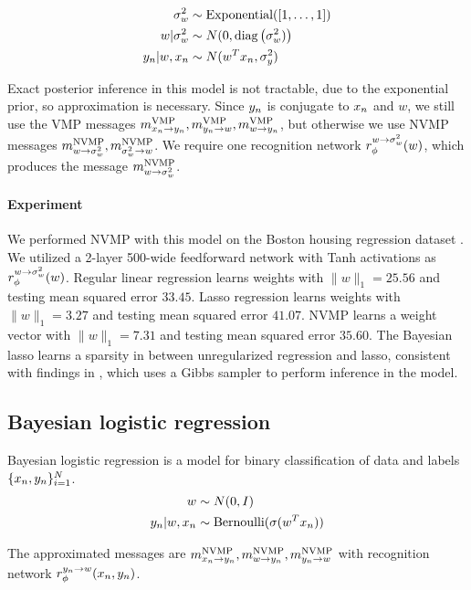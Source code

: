 \begin{align*}
    \sigma_w^2 &\sim \text{Exponential}([1, \ldots, 1]) \\
    w | \sigma^2_w &\sim N(0, \text{diag}\left(\sigma_w^2)\right) \\
    y_n | w, x_n &\sim N(w^Tx_n, \sigma^2_y)
\end{align*}

Exact posterior inference in this model is not tractable, due
to the exponential prior, so approximation is necessary. 
Since $y_n$ is conjugate to $x_n$ and $w$, we still use
the VMP messages $m^{\text{VMP}}_{x_n \rightarrow y_n}, m^{\text{VMP}}_{y_n \rightarrow w}, m^{\text{VMP}}_{w \rightarrow y_n}$,
but otherwise we use NVMP messages $m^{\text{NVMP}}_{w \rightarrow \sigma_w^2}, m^{\text{NVMP}}_{\sigma_w^2 \rightarrow w}$. We require one recognition
network $r_{\phi}^{w \rightarrow \sigma^2_w}(w)$, which produces the message $m^{\text{NVMP}}_{w \rightarrow \sigma_w^2}$.

\paragraph{Experiment} We performed NVMP with this model on the
Boston housing regression dataset \citep{Lichman2013}.
We utilized a 2-layer 500-wide feedforward network with Tanh activations
as $r_{\phi}^{w \rightarrow \sigma^2_w}(w)$.
Regular linear regression learns weights with $\|w\|_1 = 25.56$
and testing mean squared error $33.45$.
Lasso regression learns weights with $\|w\|_1 = 3.27$ 
and testing mean squared error $41.07$.
NVMP learns a weight vector with $\|w\|_1 = 7.31$
and testing mean squared error $35.60$.
The Bayesian lasso learns a sparsity
in between unregularized regression and lasso,
consistent with findings in \citet{Park2008},
which uses a Gibbs sampler to perform inference in the model.

\subsection{Bayesian logistic regression}

Bayesian logistic regression is a model for binary classification
of data and labels $\{x_n, y_n\}_{i = 1}^N$.
\begin{align*}
    w &\sim N(0, I) \\
    y_n | w, x_n &\sim \text{Bernoulli}(\sigma(w^Tx_n))
\end{align*}

The approximated messages are $m^{\text{NVMP}}_{x_n \rightarrow y_n}, m^{\text{NVMP}}_{w \rightarrow y_n}, m^{\text{NVMP}}_{y_n \rightarrow w}$ with recognition network $r_{\phi}^{y_n \rightarrow w}(x_n, y_n)$.

